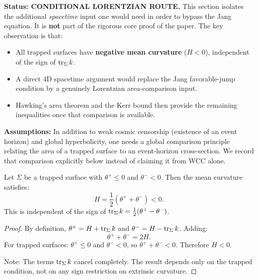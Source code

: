 \begin{remark}\label{rem:ProgramFStatus}
\textbf{Status: CONDITIONAL LORENTZIAN ROUTE.} This section isolates the additional \emph{spacetime} input one would need in order to bypass the Jang equation. It is \textbf{not} part of the rigorous core proof of the paper. The key observation is that:
\begin{itemize}
    \item All trapped surfaces have \textbf{negative mean curvature} ($H < 0$), independent of the sign of $\operatorname{tr}_\Sigma k$.
    \item A direct 4D spacetime argument would replace the Jang favorable-jump condition by a genuinely Lorentzian area-comparison input.
    \item Hawking's area theorem and the Kerr bound then provide the remaining inequalities once that comparison is available.
\end{itemize}

\textbf{Assumptions:} In addition to weak cosmic censorship (existence of an event horizon) and global hyperbolicity, one needs a global comparison principle relating the area of a trapped surface to an event-horizon cross-section. We record that comparison explicitly below instead of claiming it from WCC alone.
\end{remark}

\begin{theorem}\label{thm:UniversalH}\label{rem:UniversalMeanCurvature}
Let $\Sigma$ be a trapped surface with $\theta^+ \le 0$ and $\theta^- < 0$. Then the mean curvature satisfies:
\begin{equation}
    H = \frac{1}{2}(\theta^+ + \theta^-) < 0.
\end{equation}
This is independent of the sign of $\operatorname{tr}_\Sigma k = \frac{1}{2}(\theta^+ - \theta^-)$.
\end{theorem}

\begin{proof}
By definition, $\theta^+ = H + \operatorname{tr}_\Sigma k$ and $\theta^- = H - \operatorname{tr}_\Sigma k$. Adding:
\begin{equation}
    \theta^+ + \theta^- = 2H.
\end{equation}
For trapped surfaces: $\theta^+ \le 0$ and $\theta^- < 0$, so $\theta^+ + \theta^- < 0$. Therefore $H < 0$.

Note: The terms $\operatorname{tr}_\Sigma k$ cancel completely. The result depends only on the trapped condition, not on any sign restriction on extrinsic curvature.
\end{proof}

